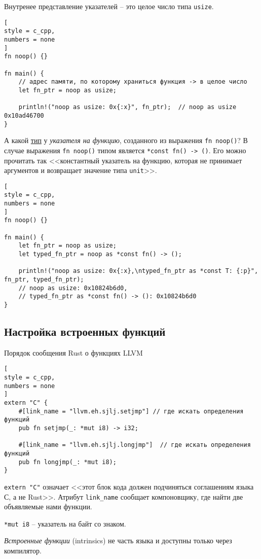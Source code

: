 \documentclass[%
	11pt,
	a4paper,
	utf8,
		]{article}
\begin{document}
Внутренее представление указателей -- это целое число типа \verb*|usize|.
\begin{lstlisting}[
style = c_cpp,
numbers = none
]
fn noop() {}

fn main() {
	// адрес памяти, по которому храниться функция -> в целое число
    let fn_ptr = noop as usize;
    
    println!("noop as usize: 0x{:x}", fn_ptr);  // noop as usize 0x10ad46700 
}
\end{lstlisting}

А какой \underline{тип} у \emph{указателя на функцию}, созданного из выражения \verb|fn noop()|? В случае выражения \verb|fn noop()| типом является \verb|*const fn() -> ()|. Его можно прочитать так <<константный указатель на функцию, которая не принимает аргументов и возвращает значение типа \verb|unit|>>.
\begin{lstlisting}[
style = c_cpp,
numbers = none	
]
fn noop() {}

fn main() {
    let fn_ptr = noop as usize;
    let typed_fn_ptr = noop as *const fn() -> ();
    
    println!("noop as usize: 0x{:x},\ntyped_fn_ptr as *const T: {:p}", fn_ptr, typed_fn_ptr);
    // noop as usize: 0x10824b6d0,
    // typed_fn_ptr as *const fn() -> (): 0x10824b6d0
}
\end{lstlisting}

\subsection{Настройка встроенных функций}

Порядок сообщения Rust о функциях LLVM
\begin{lstlisting}[
style = c_cpp,
numbers = none
]
extern "C" {
    #[link_name = "llvm.eh.sjlj.setjmp"] // где искать определения функций
    pub fn setjmp(_: *mut i8) -> i32;
    
    #[link_name = "llvm.eh.sjlj.longjmp"]  // где искать определения функций
    pub fn longjmp(_: *mut i8);
}
\end{lstlisting}

\verb|extern "C"| означает <<этот блок кода должен подчиняться соглашениям языка С, а не Rust>>. Атрибут \verb|link_name| сообщает компоновщику, где найти две объявляемые нами функции.

\verb|*mut i8| -- указатель на байт со знаком.

\emph{Встроенные функции} (intrinsics) не часть языка и доступны только через компилятор.
\end{document}
